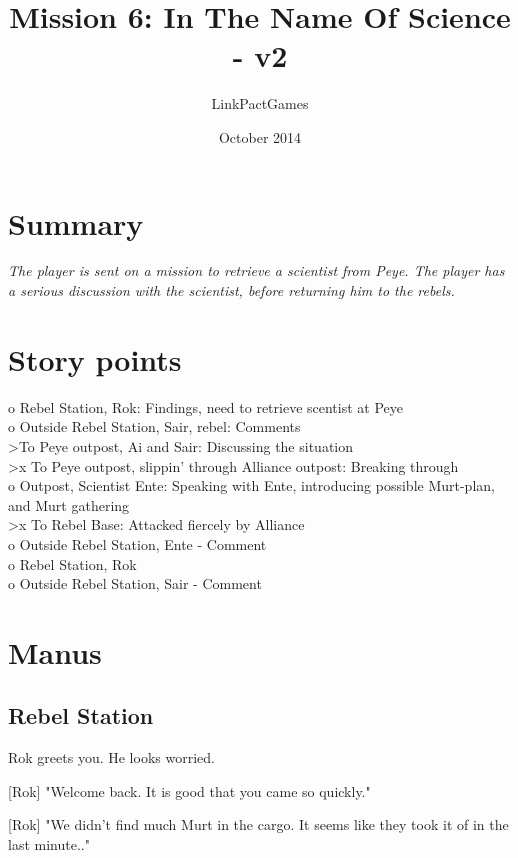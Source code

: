 \documentclass[a4paper,12pt]{article}
\begin{document}
\title{Mission 6: In The Name Of Science - v2}
\author{LinkPactGames}
\date{October 2014}
\maketitle

\section{Summary}

\textit{The player is sent on a mission to retrieve a scientist from Peye.
The player has a serious discussion with the scientist, before returning him
to the rebels.}

\section{Story points}

o Rebel Station, Rok: Findings, need to retrieve scentist at Peye\\
o Outside Rebel Station, Sair, rebel: Comments\\
\textgreater To Peye outpost, Ai and Sair: Discussing the situation\\
\textgreater x To Peye outpost, slippin' through Alliance outpost: Breaking through\\
o Outpost, Scientist Ente: Speaking with Ente, introducing possible Murt-plan, and Murt
gathering\\
\textgreater x To Rebel Base: Attacked fiercely by Alliance\\
o Outside Rebel Station, Ente - Comment\\
o Rebel Station, Rok\\
o Outside Rebel Station, Sair - Comment

\section{Manus}

\subsection{Rebel Station}

Rok greets you. He looks worried. 

[Rok] "Welcome back. It is good that you came so quickly."

[Rok] "We didn't find much Murt in the cargo. It seems like they took it of in the last minute.."
\end{document}
